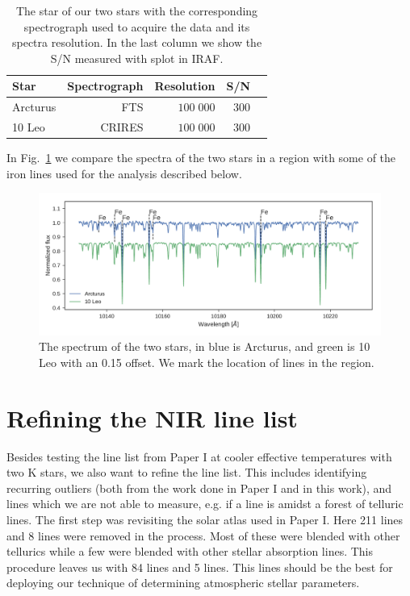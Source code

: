 \documentclass{aa}
\begin{document}
\begin{table}[htb!]
    \caption{The star of our two stars with
             the corresponding spectrograph used to acquire the data and its
             spectra resolution. In the last column we show the S/N measured
             with splot in IRAF.}
    \label{tab:data}
    \centering
    \begin{tabular}{lrrrr}
      \hline\hline
        Star      &  Spectrograph  & Resolution   &  S/N  \\
      \hline
        Arcturus  &  FTS           &  $100\;000$  &  300  \\
        10 Leo    &  CRIRES        &  $100\;000$  &  300
    \end{tabular}
\end{table}


In Fig.~\ref{fig:both} we compare the spectra of the two stars in a region with
some of the iron lines used for the analysis described below.

\begin{figure}[htpb!]
    \centering
    \includegraphics[width=1.0\linewidth]{figures/bothspectra.pdf}
    \caption{The spectrum of the two stars, in blue is Arcturus, and green is
             10 Leo with an 0.15 offset. We mark the location of 
             lines in the region.}
    \label{fig:both}
\end{figure}





\section{Refining the NIR line list}
\label{sec:refining_the_line_list}

Besides testing the line list from Paper I at cooler effective temperatures with
two K stars, we also want to refine the line list. This includes identifying
recurring outliers (both from the work done in Paper I and in this work), and
lines which we are not able to measure, e.g. if a line is amidst a forest of
telluric lines. The first step was revisiting the solar atlas used in Paper I.
Here 211  lines and 8  lines were removed in the process.
Most of these were blended with other tellurics while a few were blended with
other stellar absorption lines. This procedure leaves us with 84 
lines and 5  lines. This lines should be the best for deploying our
technique of determining atmospheric stellar parameters.
\end{document}
